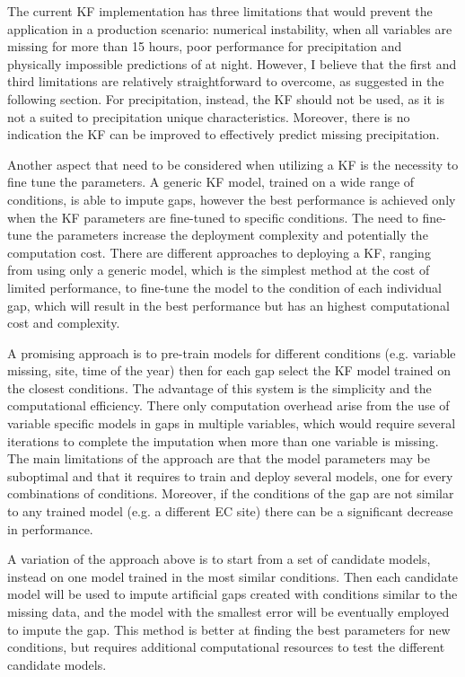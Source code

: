 \documentclass{article}
\begin{document}
The current KF implementation has three limitations that would prevent the application in a production scenario: numerical instability, when all variables are missing for more than 15 hours, poor performance for precipitation and physically impossible predictions of  at night. However, I believe that the first and third limitations are relatively straightforward to overcome, as suggested in the following section. For precipitation, instead, the KF should not be used, as it is not a suited to precipitation unique characteristics. Moreover, there is no indication the KF can be improved to effectively predict missing precipitation.

Another aspect that need to be considered when utilizing a KF is the necessity to fine tune the parameters.
A generic KF model, trained on a wide range of conditions, is able to impute gaps, however the best performance is achieved only when the KF parameters are fine-tuned to specific conditions.
The need to fine-tune the parameters increase the deployment complexity and potentially the computation cost.
There are different approaches to deploying a KF, ranging from using only a generic model, which is the simplest method at the cost of limited performance, to fine-tune the model to the condition of each individual gap, which will result in the best performance but has an highest computational cost and complexity.

A promising approach is to pre-train models for different conditions (e.g. variable missing, site, time of the year) then for each gap select the KF model trained on the closest conditions. The advantage of this system is the simplicity and the computational efficiency. There  only computation overhead arise from the use of variable specific models in gaps in multiple variables, which would require several iterations to complete the imputation when more than one variable is missing.
The main limitations of the approach are that the model parameters may be suboptimal and that it requires to train and deploy several models, one for every combinations of conditions.
Moreover, if the conditions of the gap are not similar to any trained model (e.g. a different EC site) there can be a significant decrease in performance. 

A variation of the approach above is to start from a set of candidate models, instead on one model trained in the most similar conditions. Then each candidate model will be used to impute artificial gaps created with conditions similar to the missing data, and the model with the smallest error will be eventually employed to impute the gap. This method is better at finding the best parameters for new conditions, but requires additional computational resources to test the different candidate models.
\end{document}
